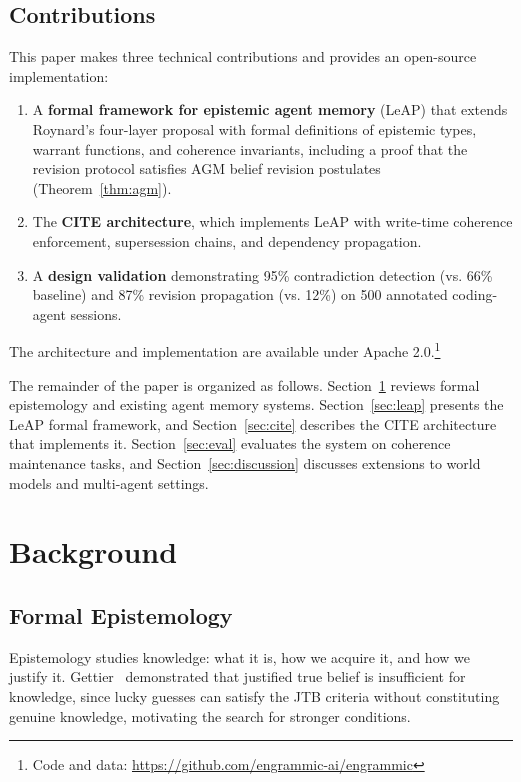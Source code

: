 \documentclass[11pt,letterpaper]{article}
\begin{document}
\subsection{Contributions}

This paper makes three technical contributions and provides an open-source implementation:
\begin{enumerate}[noitemsep]
    \item A \textbf{formal framework for epistemic agent memory} (LeAP) that extends Roynard's four-layer proposal with formal definitions of epistemic types, warrant functions, and coherence invariants, including a proof that the revision protocol satisfies AGM belief revision postulates (Theorem~\ref{thm:agm}).
    \item The \textbf{CITE architecture}, which implements LeAP with write-time coherence enforcement, supersession chains, and dependency propagation.
    \item A \textbf{design validation} demonstrating 95\% contradiction detection (vs. 66\% baseline) and 87\% revision propagation (vs. 12\%) on 500 annotated coding-agent sessions.
\end{enumerate}
The architecture and implementation are available under Apache 2.0.\footnote{Code and data: \url{https://github.com/engrammic-ai/engrammic}}

The remainder of the paper is organized as follows. Section~\ref{sec:background} reviews formal epistemology and existing agent memory systems. Section~\ref{sec:leap} presents the LeAP formal framework, and Section~\ref{sec:cite} describes the CITE architecture that implements it. Section~\ref{sec:eval} evaluates the system on coherence maintenance tasks, and Section~\ref{sec:discussion} discusses extensions to world models and multi-agent settings.

\section{Background}
\label{sec:background}

\subsection{Formal Epistemology}

Epistemology studies knowledge: what it is, how we acquire it, and how we justify it. Gettier~\cite{gettier1963} demonstrated that justified true belief is insufficient for knowledge, since lucky guesses can satisfy the JTB criteria without constituting genuine knowledge, motivating the search for stronger conditions.
\end{document}
